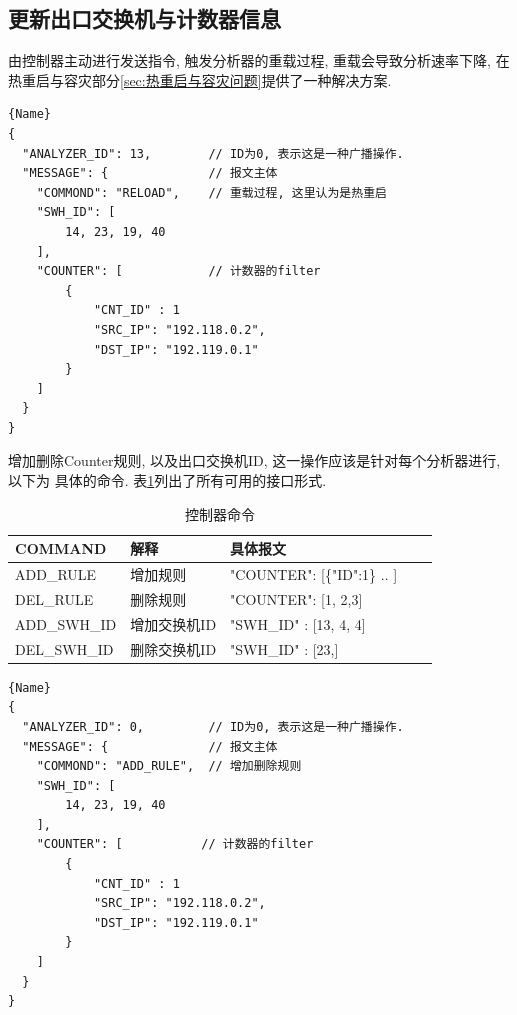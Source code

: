 \subsection{更新出口交换机与计数器信息}

由控制器主动进行发送指令, 触发分析器的重载过程, 重载会导致分析速率下降,
在热重启与容灾部分\ref{sec:热重启与容灾问题}提供了一种解决方案.

\begin{lstlisting}[caption=控制器下发指令]{Name}
{
  "ANALYZER_ID": 13,        // ID为0, 表示这是一种广播操作.
  "MESSAGE": {              // 报文主体
    "COMMOND": "RELOAD",    // 重载过程, 这里认为是热重启
    "SWH_ID": [
        14, 23, 19, 40
    ],
    "COUNTER": [            // 计数器的filter
        {
            "CNT_ID" : 1
            "SRC_IP": "192.118.0.2",
            "DST_IP": "192.119.0.1"
        }
    ]
  }
}
\end{lstlisting}

增加删除Counter规则, 以及出口交换机ID, 这一操作应该是针对每个分析器进行, 以下为
具体的命令. 表\ref{tbl:message}列出了所有可用的接口形式.


\begin{table}[]
    \centering
    \caption{控制器命令}
    \label{tbl:message}
    \begin{tabular}{lllll} \hline
    COMMAND      & 解释         & 具体报文                         \\ \hline
    ADD\_RULE    & 增加规则     & "COUNTER": {[}\{"ID":1\} .. {]}  \\
    DEL\_RULE    & 删除规则     & "COUNTER": {[}1, 2,3{]}          \\
    ADD\_SWH\_ID & 增加交换机ID & "SWH\_ID" : {[}13, 4, 4{]}       \\
    DEL\_SWH\_ID & 删除交换机ID & "SWH\_ID" : {[}23,{]}            \\ \hline
    \end{tabular}
\end{table}

\begin{lstlisting}[caption=控制器增加删除规则]{Name}
{
  "ANALYZER_ID": 0,         // ID为0, 表示这是一种广播操作.
  "MESSAGE": {              // 报文主体
    "COMMOND": "ADD_RULE",  // 增加删除规则
    "SWH_ID": [
        14, 23, 19, 40
    ],
    "COUNTER": [           // 计数器的filter
        {
            "CNT_ID" : 1
            "SRC_IP": "192.118.0.2",
            "DST_IP": "192.119.0.1"
        }
    ]
  }
}
\end{lstlisting}

